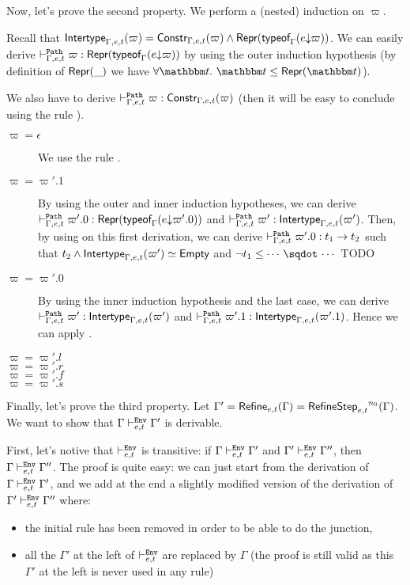 \documentclass[a4paper]{article}
\theoremstyle{definition}
\begin{document}
  Now, let's prove the second property.
  We perform a (nested) induction on $\varpi$.

  Recall that $\textsf{Intertype}_{\Gamma,e,t} (\varpi) = \textsf{Constr}_{\Gamma,e,t}(\varpi) \land \textsf{Repr}(\textsf{typeof}_{\Gamma}(e{\downarrow}\varpi))$.
  We can easily derive $\vdash^{\texttt{Path}}_{\Gamma,e,t} \varpi : \textsf{Repr}(\textsf{typeof}_{\Gamma}(e{\downarrow}\varpi))$ by using the outer induction hypothesis
  (by definition of $\textsf{Repr}(\_)$ we have $\forall \ts.\ \ts \leq \tsrep \ts$).

  We also have to derive $\vdash^{\texttt{Path}}_{\Gamma,e,t} \varpi : \textsf{Constr}_{\Gamma,e,t}(\varpi)$ (then it will be easy to conclude using the rule ).
  \begin{description}
    \item[$\varpi=\epsilon$] We use the rule .
    \item[$\varpi=\varpi'.1$] By using the outer and inner induction hypotheses, we can derive
    $\vdash^{\texttt{Path}}_{\Gamma,e,t} \varpi'.0 : \textsf{Repr}(\textsf{typeof}_{\Gamma}(e{\downarrow}\varpi'.0))$ and $\vdash^{\texttt{Path}}_{\Gamma,e,t} \varpi' : \textsf{Intertype}_{\Gamma,e,t} (\varpi')$.
    Then, by using  on this first derivation, we can derive $\vdash^{\texttt{Path}}_{\Gamma,e,t} \varpi'.0 : t_1\to t_2$
    such that $t_2 \land  \textsf{Intertype}_{\Gamma,e,t} (\varpi') \simeq \textsf{Empty}$ and $\neg t_1 \leq \worra {\cdots} {\cdots}$ TODO
    \item[$\varpi=\varpi'.0$] By using the inner induction hypothesis and the last case, we can derive
    $\vdash^{\texttt{Path}}_{\Gamma,e,t} \varpi' : \textsf{Intertype}_{\Gamma,e,t} (\varpi')$ and $\vdash^{\texttt{Path}}_{\Gamma,e,t} \varpi'.1 : \textsf{Intertype}_{\Gamma,e,t} (\varpi'.1)$.
    Hence we can apply .
    \item[$\varpi=\varpi'.l$]
    \item[$\varpi=\varpi'.r$]
    \item[$\varpi=\varpi'.f$]
    \item[$\varpi=\varpi'.s$]    
  \end{description}

  Finally, let's prove the third property.
  Let $\Gamma' = \textsf{Refine}_{e,t}(\Gamma) = {\textsf{RefineStep}_{e,t}}^{n_0}(\Gamma)$.
  We want to show that $\Gamma \vdash^{\texttt{Env}}_{e,t} \Gamma'$ is derivable.

  First, let's notive that $\vdash^{\texttt{Env}}_{e,t}$ is transitive:
  if $\Gamma \vdash^{\texttt{Env}}_{e,t} \Gamma'$ and $\Gamma' \vdash^{\texttt{Env}}_{e,t} \Gamma''$, then $\Gamma \vdash^{\texttt{Env}}_{e,t} \Gamma''$.
  The proof is quite easy: we can just start from the derivation of $\Gamma \vdash^{\texttt{Env}}_{e,t} \Gamma'$, and we add
  at the end a slightly modified version of the derivation of $\Gamma' \vdash^{\texttt{Env}}_{e,t} \Gamma''$ where:
  \begin{itemize}
    \item the initial  rule has been removed in order to be able to do the junction,
    \item all the $\Gamma'$ at the left of $\vdash^{\texttt{Env}}_{e,t}$ are replaced by $\Gamma$
    (the proof is still valid as this $\Gamma'$ at the left is never used in any rule)
  \end{itemize}
\end{document}
